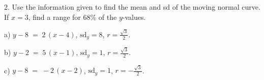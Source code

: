 \documentclass[10pt]{article}
\begin{document}
2. Use the information given to find the mean and sd of the moving normal curve.
If $x=3$,  find a range for 68\% of the $y$-values.

\hspace{10pt} a) $y-8\;=\;2\,(x-4)$, $\mbox{sd}_y=8$, $r=\frac{\sqrt{3}}{2}$.
\vspace{1.5in}

\hspace{10pt} b) $y-2\;=\;5\,(x-1)$, $\mbox{sd}_y=1$, $r=\frac{\sqrt{3}}{2}$.
\vspace{1.5in}

\hspace{10pt} c) $y-8\;=\;-2\,(x-2)$, $\mbox{sd}_y=1$, $r=-\frac{\sqrt{3}}{2}$.


\vfill
\eject
\end{document}
